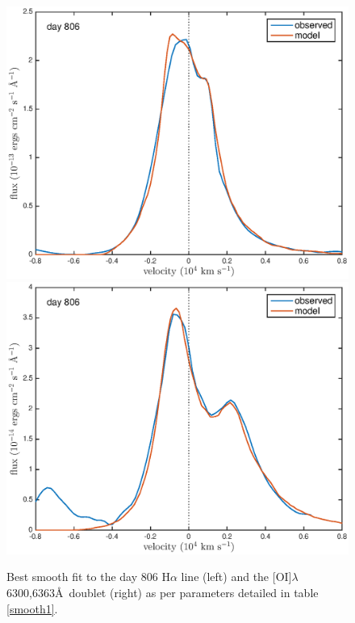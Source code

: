 \documentclass[useAMS,usenatbib,usegraphicx]{mnras}
\begin{document}
\begin{figure}
\begin{center}
\includegraphics[trim =37 10 45 15,clip=true,scale=0.51]{smooth/best_fit/d806Ha}
\includegraphics[trim =37 10 45 15,clip=true,scale=0.51]{smooth/best_fit/d806OI}
\caption{Best smooth fit to the day 806 H$\alpha$ line (left) and the [OI]$\lambda$6300,6363\AA\ doublet (right) as per parameters detailed in table \ref{smooth1}.}
\label{d806bf}
\end{center}
\end{figure}
\end{document}
